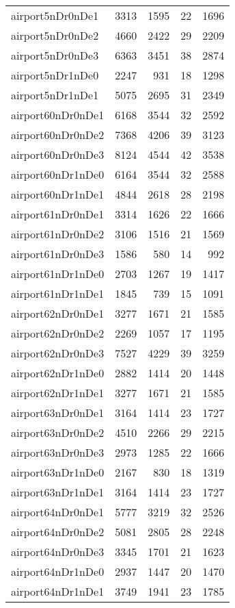 \begin{longtable}{lrrrr}
airport5nDr0nDe1 & 3313 & 1595 & 22 & 1696 \\
airport5nDr0nDe2 & 4660 & 2422 & 29 & 2209 \\
airport5nDr0nDe3 & 6363 & 3451 & 38 & 2874 \\
airport5nDr1nDe0 & 2247 & 931 & 18 & 1298 \\
airport5nDr1nDe1 & 5075 & 2695 & 31 & 2349 \\
airport60nDr0nDe1 & 6168 & 3544 & 32 & 2592 \\
airport60nDr0nDe2 & 7368 & 4206 & 39 & 3123 \\
airport60nDr0nDe3 & 8124 & 4544 & 42 & 3538 \\
airport60nDr1nDe0 & 6164 & 3544 & 32 & 2588 \\
airport60nDr1nDe1 & 4844 & 2618 & 28 & 2198 \\
airport61nDr0nDe1 & 3314 & 1626 & 22 & 1666 \\
airport61nDr0nDe2 & 3106 & 1516 & 21 & 1569 \\
airport61nDr0nDe3 & 1586 & 580 & 14 & 992 \\
airport61nDr1nDe0 & 2703 & 1267 & 19 & 1417 \\
airport61nDr1nDe1 & 1845 & 739 & 15 & 1091 \\
airport62nDr0nDe1 & 3277 & 1671 & 21 & 1585 \\
airport62nDr0nDe2 & 2269 & 1057 & 17 & 1195 \\
airport62nDr0nDe3 & 7527 & 4229 & 39 & 3259 \\
airport62nDr1nDe0 & 2882 & 1414 & 20 & 1448 \\
airport62nDr1nDe1 & 3277 & 1671 & 21 & 1585 \\
airport63nDr0nDe1 & 3164 & 1414 & 23 & 1727 \\
airport63nDr0nDe2 & 4510 & 2266 & 29 & 2215 \\
airport63nDr0nDe3 & 2973 & 1285 & 22 & 1666 \\
airport63nDr1nDe0 & 2167 & 830 & 18 & 1319 \\
airport63nDr1nDe1 & 3164 & 1414 & 23 & 1727 \\
airport64nDr0nDe1 & 5777 & 3219 & 32 & 2526 \\
airport64nDr0nDe2 & 5081 & 2805 & 28 & 2248 \\
airport64nDr0nDe3 & 3345 & 1701 & 21 & 1623 \\
airport64nDr1nDe0 & 2937 & 1447 & 20 & 1470 \\
airport64nDr1nDe1 & 3749 & 1941 & 23 & 1785 \\

\end{longtable}
